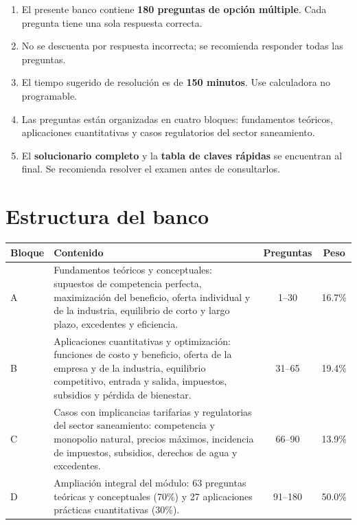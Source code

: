 \documentclass[11pt,a4paper]{article}
\begin{document}
\begin{enumerate}[label=\arabic*.,leftmargin=1.6em,itemsep=3pt]
  \item El presente banco contiene \textbf{180 preguntas de opción múltiple}. Cada pregunta tiene una sola respuesta correcta.
  \item No se descuenta por respuesta incorrecta; se recomienda responder todas las preguntas.
  \item El tiempo sugerido de resolución es de \textbf{150 minutos}. Use calculadora no programable.
  \item Las preguntas están organizadas en cuatro bloques: fundamentos teóricos, aplicaciones cuantitativas y casos regulatorios del sector saneamiento.
  \item El \textbf{solucionario completo} y la \textbf{tabla de claves rápidas} se encuentran al final. Se recomienda resolver el examen antes de consultarlos.
\end{enumerate}

\section*{Estructura del banco}

\begin{center}
\renewcommand{\arraystretch}{1.25}
\begin{tabular}{@{}p{1.4cm}>{\raggedright\arraybackslash}p{7.6cm}cc@{}}
\toprule
\textbf{Bloque} & \textbf{Contenido} & \textbf{Preguntas} & \textbf{Peso} \\
\midrule
A & Fundamentos teóricos y conceptuales: supuestos de competencia perfecta, maximización del beneficio, oferta individual y de la industria, equilibrio de corto y largo plazo, excedentes y eficiencia. & 1--30 & 16.7\% \\
B & Aplicaciones cuantitativas y optimización: funciones de costo y beneficio, oferta de la empresa y de la industria, equilibrio competitivo, entrada y salida, impuestos, subsidios y pérdida de bienestar. & 31--65 & 19.4\% \\
C & Casos con implicancias tarifarias y regulatorias del sector saneamiento: competencia y monopolio natural, precios máximos, incidencia de impuestos, subsidios, derechos de agua y excedentes. & 66--90 & 13.9\% \\
D & Ampliación integral del módulo: 63 preguntas teóricas y conceptuales (70\%) y 27 aplicaciones prácticas cuantitativas (30\%). & 91--180 & 50.0\% \\
\bottomrule
\end{tabular}
\end{center}
\end{document}
